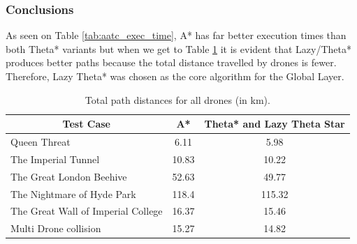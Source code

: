 \documentclass[a4paper,12pt,titlepage]{article}
\begin{document}
\subsubsection{Conclusions}
As seen on Table \ref{tab:aatc_exec_time}, A* has far better execution times than both Theta* variants but when we get to Table \ref{tab:aatc_total_drone_distance} it is evident that Lazy/Theta* produces better paths because the total distance travelled by drones is fewer. Therefore, Lazy Theta* was chosen as the core algorithm for the Global Layer.

\begin{table}[!hbpt]
\centering
\begin{tabular}{|l|c|c|}
\hline
\multicolumn{1}{|c|}{Test Case} & A* & \multicolumn{1}{l|}{Theta* and Lazy Theta Star} \\ \hline
Queen Threat & 6.11 & 5.98 \\ \hline
The Imperial Tunnel & 10.83 & 10.22 \\ \hline
The Great London Beehive & 52.63 & 49.77 \\ \hline
The Nightmare of Hyde Park & 118.4 & 115.32 \\ \hline
The Great Wall of Imperial College & 16.37 & 15.46 \\ \hline
Multi Drone collision & 15.27 & 14.82 \\ \hline
\end{tabular}
\caption{Total path distances for all drones (in km). \cite{Balaji2017}}
\label{tab:aatc_total_drone_distance}
\end{table}
\end{document}
